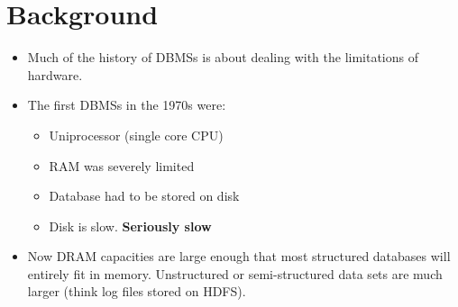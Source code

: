 \documentclass[11pt]{article}
\begin{document}
\maketitle
\thispagestyle{plain}

\section{Background}
\begin{itemize}
    \item
    Much of the history of DBMSs is about dealing with the limitations of hardware.
    
    
    \item
    The first DBMSs in the 1970s were:
    \begin{itemize}
        \item Uniprocessor (single core CPU)
        \item RAM was severely limited
        \item Database had to be stored on disk
        \item Disk is slow. \textbf{Seriously slow}
    \end{itemize}
    
    \item
    Now DRAM capacities are large enough that most structured databases will entirely fit in memory.
    Unstructured or semi-structured data sets are much larger (think log files stored on HDFS).

\end{itemize}
\end{document}

